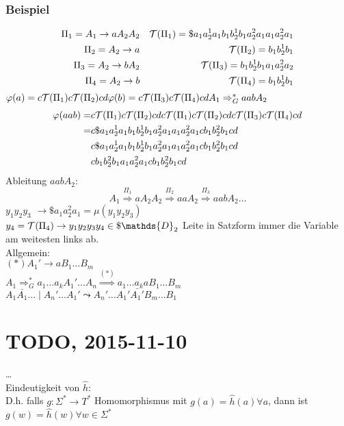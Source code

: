         \subsubsection{Beispiel}
            \begin{align*}
                \Pi_1=A_1\rightarrow aA_2A_2 && \mathcal{T}(\Pi_1)=\$a_1a_2^1a_1b_1b_2^1b_1a_2^2a_1a_1a_2^2a_1\\
                \Pi_2=A_2\rightarrow a && \mathcal{T}(\Pi_2)=b_1b_2^1b_1\\
                \Pi_3=A_2\rightarrow bA_2 && \mathcal{T}(\Pi_3)=b_1b_2^1b_1a_1a_2^2a_2\\
                \Pi_4=A_2\rightarrow b && \mathcal{T}(\Pi_4)=b_1b_2^1b_1
            \end{align*}
            $\varphi(a) = c\mathcal{T}(\Pi_1)c\mathcal{T}(\Pi_2)cd\\
            \varphi(b) = c\mathcal{T}(\Pi_3)c\mathcal{T}(\Pi_4)cd\\
            A_1\Rightarrow_G^* aabA_2$\\
            \begin{align*}
                \varphi(aab) =& c\mathcal{T}(\Pi_1)c\mathcal{T}(\Pi_2)cdc\mathcal{T}(\Pi_1)c\mathcal{T}(\Pi_2)cdc\mathcal{T}(\Pi_3)c\mathcal{T}(\Pi_4)cd\\
                =& c\$a_1a_2^1a_1b_1b_2^1b_1a_2^2a_1a_1a_2^2a_1cb_1b_2^2b_1cd\\
                &c\$a_1a_2^1a_1b_1b_2^1b_1a_2^2a_1a_1a_2^2a_1cb_1b_2^2b_1cd\\
                &cb_1b_2^2b_1a_1a_2^2a_1cb_1b_2^2b_1cd
            \end{align*}
            Ableitung $aabA_2$:\\
            $$A_1\overset{\Pi_1}{\Rightarrow}aA_2A_2\overset{\Pi_2}{\Rightarrow}aaA_2\overset{\Pi_3}{\Rightarrow}aabA_2\dots$$
            $y_1y_2y_3$ $\rightarrow \$a_1a_2^2a_1=\mu(y_1y_2y_3)$\\
            $y_4=\Tau(\Pi_4)\rightarrow y_1y_2y_3y_4\in\$\mathds{D}_2$
            Leite in Satzform immer die Variable am weitesten links ab.\\
            Allgemein:\\
            $(*) A_1'\rightarrow aB_1\dots B_m$\\
            $A_1\Rightarrow_G^* a_1\dots a_kA_1'\dots A_n \overset{(*)}{\Rightarrow} a_1\dots a_kaB_1\dots B_m$\\
            $A_1\bar{A_1}\dots \mid A_n'\dots A_1'\leadsto A_n'\dots A_1'\bar{A_1'}B_m\dots B_1$
    \section{TODO, 2015-11-10}
    \dots\\
    Eindeutigkeit von $\hat{h}$:\\
    D.h. falls $g:\Sigma^*\rightarrow T^*$ Homomorphismus mit $g(a)=\hat{h}(a)\forall a$, dann ist $g(w)=\hat{h}(w)\forall w\in\Sigma^*$
